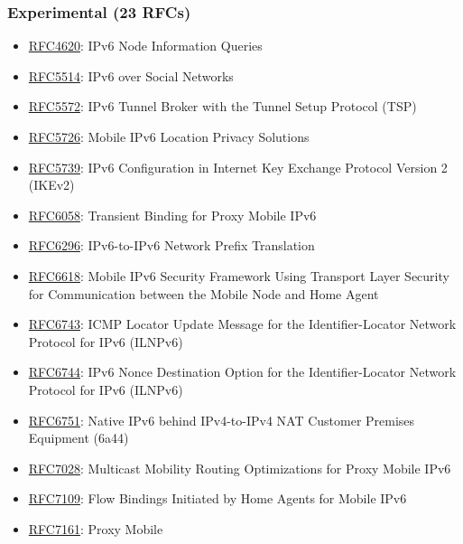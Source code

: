 \documentclass[
]{article}
\providecommand{\tightlist}{%
  \setlength{\itemsep}{0pt}\setlength{\parskip}{0pt}}
\begin{document}
\subsubsection{Experimental (23 RFCs)}\label{experimental-23-rfcs}

\begin{itemize}
\tightlist
\item
  \href{https://www.rfc-editor.org/info/rfc4620}{RFC4620}: IPv6 Node
  Information Queries
\item
  \href{https://www.rfc-editor.org/info/rfc5514}{RFC5514}: IPv6 over
  Social Networks
\item
  \href{https://www.rfc-editor.org/info/rfc5572}{RFC5572}: IPv6 Tunnel
  Broker with the Tunnel Setup Protocol (TSP)
\item
  \href{https://www.rfc-editor.org/info/rfc5726}{RFC5726}: Mobile IPv6
  Location Privacy Solutions
\item
  \href{https://www.rfc-editor.org/info/rfc5739}{RFC5739}: IPv6
  Configuration in Internet Key Exchange Protocol Version 2 (IKEv2)
\item
  \href{https://www.rfc-editor.org/info/rfc6058}{RFC6058}: Transient
  Binding for Proxy Mobile IPv6
\item
  \href{https://www.rfc-editor.org/info/rfc6296}{RFC6296}: IPv6-to-IPv6
  Network Prefix Translation
\item
  \href{https://www.rfc-editor.org/info/rfc6618}{RFC6618}: Mobile IPv6
  Security Framework Using Transport Layer Security for Communication
  between the Mobile Node and Home Agent
\item
  \href{https://www.rfc-editor.org/info/rfc6743}{RFC6743}: ICMP Locator
  Update Message for the Identifier-Locator Network Protocol for IPv6
  (ILNPv6)
\item
  \href{https://www.rfc-editor.org/info/rfc6744}{RFC6744}: IPv6 Nonce
  Destination Option for the Identifier-Locator Network Protocol for
  IPv6 (ILNPv6)
\item
  \href{https://www.rfc-editor.org/info/rfc6751}{RFC6751}: Native IPv6
  behind IPv4-to-IPv4 NAT Customer Premises Equipment (6a44)
\item
  \href{https://www.rfc-editor.org/info/rfc7028}{RFC7028}: Multicast
  Mobility Routing Optimizations for Proxy Mobile IPv6
\item
  \href{https://www.rfc-editor.org/info/rfc7109}{RFC7109}: Flow Bindings
  Initiated by Home Agents for Mobile IPv6
\item
  \href{https://www.rfc-editor.org/info/rfc7161}{RFC7161}: Proxy Mobile

\end{itemize}
\end{document}
